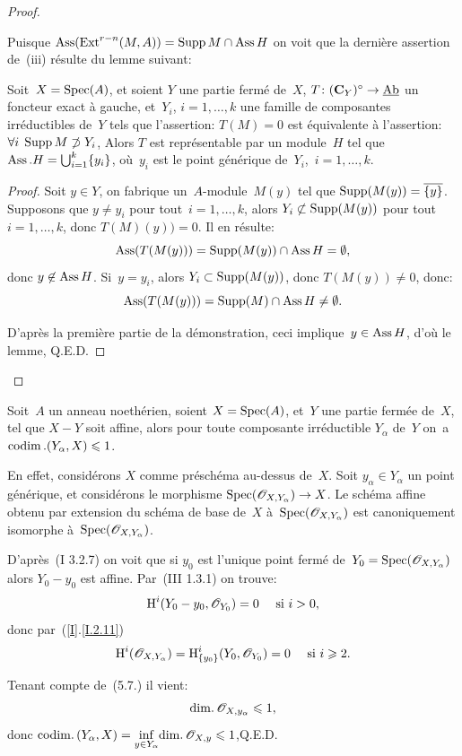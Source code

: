 \begin{proof}
\begin{enumeratei}
Puisque $\operatorname{Ass}(\operatorname{Ext}^{r-n}(M, A))=\operatorname{Supp} M\cap\operatorname{Ass} H$ on voit que la derni\`ere assertion de~(iii) r\'esulte du lemme suivant:
\end{enumeratei}

\begin{lemme} \label{V.3.3} Soit~$X=\operatorname{Spec}(A)$, et soient $Y$ une partie ferm\'e de~$X$, $T\colon (\CC_{Y})^{\circ}\to\Ab$ un foncteur exact \`a gauche, et~$Y_{i}$, $i=1,\dots, k$ une famille de composantes irr\'eductibles de~$Y$ tels que l'assertion: $T(M)=0$ est \'equivalente \`a l'assertion: $\forall i\;\operatorname{Supp} M\not\supset Y_{i}$, Alors $T$ est repr\'esentable par un module~$H$ tel que $\operatorname{Ass}.H=\bigcup_{i=1}^{k}\{y_{i}\}$, o\`u~$y_{i}$ est le point g\'en\'erique de~$Y_{i}$,~$i=1,\dots, k$.
\end{lemme}

\begin{proof}
Soit $y\in Y$, on fabrique un~$A$-module~$M(y)$ tel que $\operatorname{Supp}(M(y))=\overline{\{ y\} }$. Supposons que $y\neq y_{i}$ pour tout~$i=1,\dots, k$, alors $Y_{i}\not\subset\operatorname{Supp}(M(y))$ pour tout~$i=1,\dots, k$, donc $T(M)(y))=0$. Il en r\'esulte:
$$
\operatorname{Ass}(T(M(y)))=\operatorname{Supp}(M(y))\cap\operatorname{Ass} H=\emptyset,
$$
donc $y\not\in\operatorname{Ass} H$. Si~$y=y_{i}$, alors $Y_{i}\subset\operatorname{Supp}(M(y))$, donc $T(M(y))\neq 0$, donc:
$$
\operatorname{Ass}(T(M(y)))=\operatorname{Supp}(M)\cap\operatorname{Ass} H\neq\emptyset.
$$

D'apr\`es la premi\`ere partie de la d\'emonstration, ceci implique~$y\in\operatorname{Ass} H$, d'o\`u le lemme, \hfill Q.E.D.
\skipqed
\end{proof}
\skipqed
\end{proof}

\begin{exemple} \label{V.3.4}
Soit~$A$ un anneau noeth\'erien, soient $X=\operatorname{Spec}(A)$, et~$Y$ une partie ferm\'ee de~$X$, tel que $X-Y$ soit affine, alors pour toute composante irr\'eductible $Y_{\alpha}$ de~$Y$ on~a $\operatorname{codim}.(Y_{\alpha}, X)\leqslant 1$.

En effet, consid\'erons $X$ comme pr\'esch\'ema au-dessus de~$X$. Soit $y_{\alpha}\in Y_{\alpha}$ un point g\'en\'erique, et consid\'erons le morphisme $\Spec(\Oo_{X, Y_{\alpha}})\to X$. Le sch\'ema affine obtenu par extension du sch\'ema de base de~$X$ \`a~$\operatorname{Spec}({\mathscr O}_{X, Y_{\alpha}})$ est canoniquement isomorphe \`a~$\operatorname{Spec}({\mathscr O}_{X, Y_{\alpha}})$.

D'apr\`es~(\EGA I 3.2.7) on voit que si $y_{0}$ est l'unique point ferm\'e de~$Y_{0}=\operatorname{Spec}({\mathscr O}_{X, Y_{\alpha}})$ alors $Y_{0}- y_{0}$ est affine. Par~(\EGA III 1.3.1) on trouve:
$$
\operatorname{H}^{i}(Y_{0}- y_{0}, {\mathscr O}_{Y_{0}})=0\quad\textrm{ si }i>0,
$$
donc par~(\ref{I}.\ref{I.2.11})
$$
\operatorname{H}^{i}({\mathscr O}_{X, Y_{\alpha}})=\operatorname{H}_{\{ y_{0}\} }^{i}(Y_{0}, {\mathscr O}_{Y_{0}})=0\quad\textrm{ si }i\geqslant 2.
$$

Tenant compte de~(5.7.) il vient:
$$
\mathrm{dim}.\, {\mathscr O}_{X, y_{\alpha}}\leqslant 1,
$$
donc $\mathrm{codim}.\, (Y_{\alpha}, X)=\underset{y\in Y_{\alpha}}{\inf}\mathrm{dim}.\, {\mathscr O}_{X, y}\leqslant 1$,\hfill Q.E.D.
\end{exemple}

